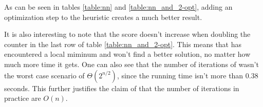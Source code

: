 As can be seen in tables \ref{table:nn} and \ref{table:nn_and_2-opt}, adding an
optimization step to the heuristic creates a much better result. 

It is also interesting to note that the score doesn't increase when doubling
the counter in the last row of table \ref{table:nn_and_2-opt}. This means that
 has encountered a local miminum and won't find a better solution,
no matter how much more time it gets. One can also see that the number of
iterations of  wasn't the worst case scenario of
$\Theta(2^{n/2})$, since the running time isn't more than 0.38 seconds. This
further justifies the claim of \cite{hastad} that the number of iterations in
practice are $O(n)$.

